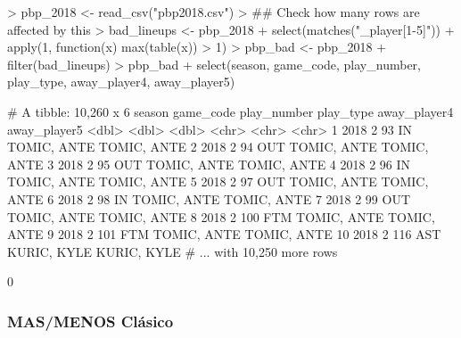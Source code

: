 \documentclass[paper=a4, fontsize=9pt]{article}
\begin{document}
\begin{Schunk}
\begin{Sinput}
> pbp_2018 <- read_csv("pbp2018.csv")
> ## Check how many rows are affected by this
> bad_lineups <- pbp_2018 %
+   select(matches("_player[1-5]")) %
+   apply(1, function(x) max(table(x)) > 1)
> pbp_bad <- pbp_2018 %
+   filter(bad_lineups)
> pbp_bad %
+   select(season, game_code, play_number, play_type, away_player4, away_player5)
\end{Sinput}
\begin{Soutput}
# A tibble: 10,260 x 6
   season game_code play_number play_type away_player4 away_player5
    <dbl>     <dbl>       <dbl> <chr>     <chr>        <chr>       
 1   2018         2          93 IN        TOMIC, ANTE  TOMIC, ANTE 
 2   2018         2          94 OUT       TOMIC, ANTE  TOMIC, ANTE 
 3   2018         2          95 OUT       TOMIC, ANTE  TOMIC, ANTE 
 4   2018         2          96 IN        TOMIC, ANTE  TOMIC, ANTE 
 5   2018         2          97 OUT       TOMIC, ANTE  TOMIC, ANTE 
 6   2018         2          98 IN        TOMIC, ANTE  TOMIC, ANTE 
 7   2018         2          99 OUT       TOMIC, ANTE  TOMIC, ANTE 
 8   2018         2         100 FTM       TOMIC, ANTE  TOMIC, ANTE 
 9   2018         2         101 FTM       TOMIC, ANTE  TOMIC, ANTE 
10   2018         2         116 AST       KURIC, KYLE  KURIC, KYLE 
# ... with 10,250 more rows
\end{Soutput}
\begin{Soutput}
[1] 0
\end{Soutput}
\end{Schunk}

\subsubsection{MAS/MENOS Clásico}
    
\end{document}

